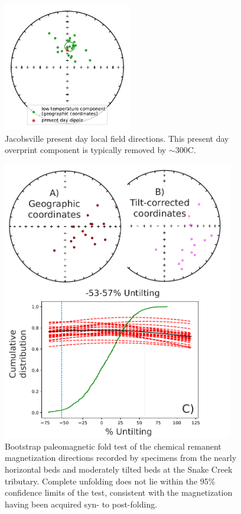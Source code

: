 \begin{figure}
\centering
\includegraphics[width=0.5\textwidth]{figure/Zhang2024a/Jacobsville_pdf_directions.pdf}
\caption{Jacobsville present day local field directions. This present day overprint component is typically removed by $\sim$300\textdegree C.}
\label{fig:Jacobsville_pdf}
\end{figure}

\begin{figure}
\centering
\includegraphics[width=0.9\textwidth]{figure/Zhang2024a/SI_hct_fold_test.pdf}
\caption{Bootstrap paleomagnetic fold test \citep{Tauxe1994a} of the chemical remanent magnetization directions recorded by specimens from the nearly horizontal beds and moderately tilted beds at the Snake Creek tributary. Complete unfolding does not lie within the 95\% confidence limits of the test, consistent with the magnetization having been acquired syn- to post-folding.}
\label{fig:Jacobsville_hct_fold_test}
\end{figure}

